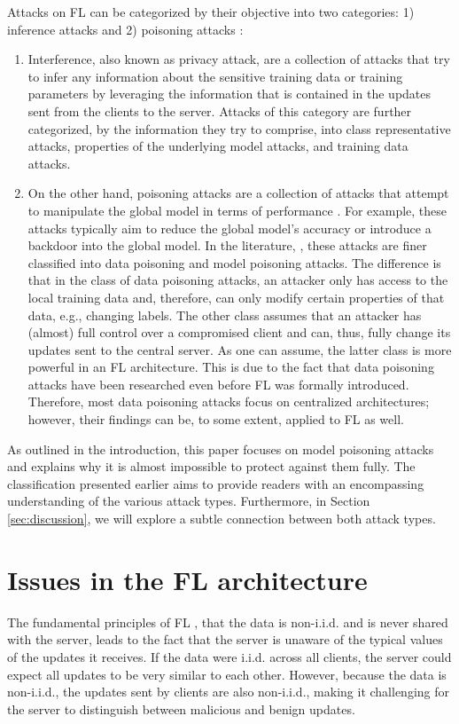 \documentclass[conference]{IEEEtran}
\begin{document}
Attacks on FL can be categorized by their objective into two categories: 1) inference attacks and 2) poisoning attacks \cite{Lyu2020}:
\begin{enumerate}
    \item Interference, also known as privacy attack, are a collection of attacks that try to infer any information about the sensitive training data or training parameters \cite{Lyu2020,Balunovic2022} by leveraging the information that is contained in the updates sent from the clients to the server. Attacks of this category are further categorized, by the information they try to comprise, into class representative attacks, properties of the underlying model attacks, and training data attacks.
     
    \item On the other hand, poisoning attacks are a collection of attacks that attempt to manipulate the global model in terms of performance \cite{Lyu2020,Bagdasaryan2018}. For example, these attacks typically aim to reduce the global model's accuracy or introduce a backdoor into the global model. In the literature, \cite{Lyu2020}, these attacks are finer classified into data poisoning and model poisoning attacks. The difference is that in the class of data poisoning attacks, an attacker only has access to the local training data and, therefore, can only modify certain properties of that data, e.g., changing labels. The other class assumes that an attacker has (almost) full control over a compromised client and can, thus, fully change its updates sent to the central server. As one can assume, the latter class is more powerful in an FL architecture. This is due to the fact that data poisoning attacks have been researched even before FL was formally introduced. Therefore, most data poisoning attacks focus on centralized architectures; however, their findings can be, to some extent, applied to FL as well.
\end{enumerate}
As outlined in the introduction, this paper focuses on model poisoning attacks and explains why it is almost impossible to protect against them fully. The classification presented earlier aims to provide readers with an encompassing understanding of the various attack types. Furthermore, in Section \ref{sec:discussion}, we will explore a subtle connection between both attack types.

\section{Issues in the FL architecture}\label{sec:fundamental_issues_in_fl}
The fundamental principles of FL \cite{McMahan2017}, that the data is non-i.i.d. and is never shared with the server, leads to the fact that the server is unaware of the typical values of the updates it receives. If the data were i.i.d. across all clients, the server could expect all updates to be very similar to each other. However, because the data is non-i.i.d., the updates sent by clients are also non-i.i.d., making it challenging for the server to distinguish between malicious and benign updates.
\end{document}
